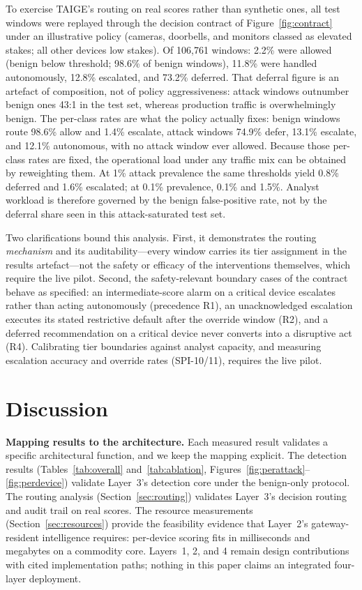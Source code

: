\documentclass[sigconf,review,anonymous]{acmart}
\begin{document}
To exercise TAIGE's routing on real scores rather than synthetic ones, all test windows were replayed through the decision contract of Figure~\ref{fig:contract} under an illustrative policy (cameras, doorbells, and monitors classed as elevated stakes; all other devices low stakes). Of 106{,}761 windows: 2.2\% were allowed (benign below threshold; 98.6\% of benign windows), 11.8\% were handled autonomously, 12.8\% escalated, and 73.2\% deferred. That deferral figure is an artefact of composition, not of policy aggressiveness: attack windows outnumber benign ones 43:1 in the test set, whereas production traffic is overwhelmingly benign. The per-class rates are what the policy actually fixes: benign windows route 98.6\% allow and 1.4\% escalate, attack windows 74.9\% defer, 13.1\% escalate, and 12.1\% autonomous, with no attack window ever allowed. Because those per-class rates are fixed, the operational load under any traffic mix can be obtained by reweighting them. At 1\% attack prevalence the same thresholds yield 0.8\% deferred and 1.6\% escalated; at 0.1\% prevalence, 0.1\% and 1.5\%. Analyst workload is therefore governed by the benign false-positive rate, not by the deferral share seen in this attack-saturated test set.

Two clarifications bound this analysis. First, it demonstrates the routing \emph{mechanism} and its auditability---every window carries its tier assignment in the results artefact---not the safety or efficacy of the interventions themselves, which require the live pilot. Second, the safety-relevant boundary cases of the contract behave as specified: an intermediate-score alarm on a critical device escalates rather than acting autonomously (precedence R1), an unacknowledged escalation executes its stated restrictive default after the override window (R2), and a deferred recommendation on a critical device never converts into a disruptive act (R4). Calibrating tier boundaries against analyst capacity, and measuring escalation accuracy and override rates (SPI-10/11), requires the live pilot.

\section{Discussion}
\label{sec:discussion}

\textbf{Mapping results to the architecture.} Each measured result validates a specific architectural function, and we keep the mapping explicit. The detection results (Tables~\ref{tab:overall} and~\ref{tab:ablation}, Figures~\ref{fig:perattack}--\ref{fig:perdevice}) validate Layer~3's detection core under the benign-only protocol. The routing analysis (Section~\ref{sec:routing}) validates Layer~3's decision routing and audit trail on real scores. The resource measurements (Section~\ref{sec:resources}) provide the feasibility evidence that Layer~2's gateway-resident intelligence requires: per-device scoring fits in milliseconds and megabytes on a commodity core. Layers~1, 2, and 4 remain design contributions with cited implementation paths; nothing in this paper claims an integrated four-layer deployment.
\end{document}
